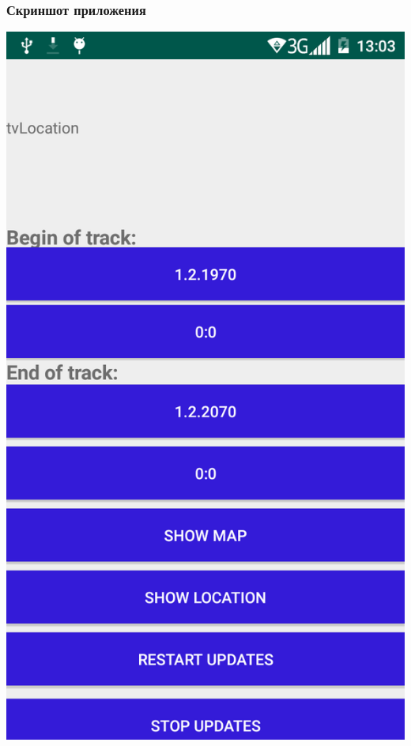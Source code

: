 \documentclass[hyperref={unicode}]{beamer}
\begin{document}
\begin{frame}
\frametitle{Скриншот приложения}
\begin{center}
	\includegraphics[height=0.8\textheight]{images/Screen_time1.png}

\end{center}
\end{frame}
\end{document}
